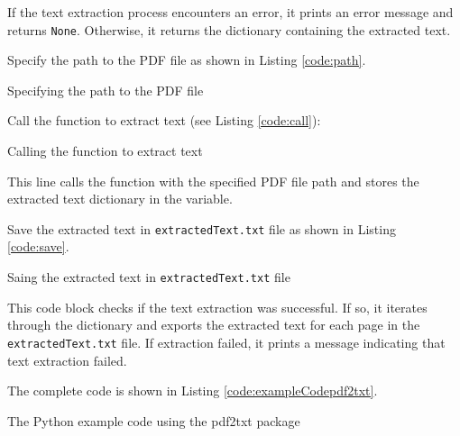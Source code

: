 If the text extraction process encounters an error, it prints an error message and returns \texttt{None}. Otherwise, it returns the dictionary containing the extracted text.

Specify the path to the PDF file as shown in Listing \ref{code:path}.

\begin{code}[h!]
	    
	
	\caption{Specifying the path to the PDF file}
	\label{code:path}
\end{code}

Call the function to extract text (see Listing \ref{code:call}):

\begin{code}[h!]
	    
	
	\caption{Calling the function to extract text}
	\label{code:call}
\end{code}

This line calls the  function with the specified PDF file path and stores the extracted text dictionary in the  variable.

Save the extracted text in \texttt{extractedText.txt} file as shown in Listing \ref{code:save}.

\begin{code}[h!]
	    
	
	\caption{Saing the extracted text in \texttt{extractedText.txt} file}
	\label{code:save}
\end{code}

This code block checks if the text extraction was successful. If so, it iterates through the dictionary and exports the extracted text for each page in the \texttt{extractedText.txt} file. If extraction failed, it prints a message indicating that text extraction failed.

The complete code is shown in Listing \ref{code:exampleCodepdf2txt}.

\begin{code}[h!]
	    
	
	\caption{The Python example code using the pdf2txt package}
	\label{code:exampleCodepdf2txt}
\end{code}

